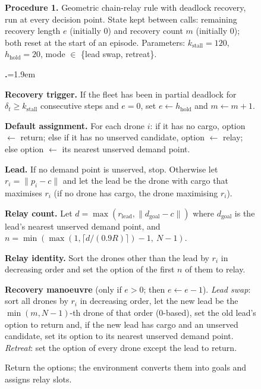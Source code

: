 \documentclass[final,5p,times,twocolumn]{elsarticle}
\newcounter{procstep}
\newenvironment{procsteps}{\setcounter{procstep}{0}\begin{list}{\stepcounter{procstep}\textbf{\theprocstep.}}{\leftmargin=1.9em\itemsep=1.5pt\parsep=0pt\topsep=3pt}}{\end{list}}
\begin{document}
\begin{figure}[t]
\footnotesize
\noindent\textbf{Procedure 1.} Geometric chain-relay rule with deadlock recovery, run at every
decision point. State kept between calls: remaining recovery length $e$ (initially 0) and recovery
count $m$ (initially 0); both reset at the start of an episode. Parameters:
$k_{\mathrm{stall}} = 120$, $h_{\mathrm{hold}} = 20$, mode $\in$ \{lead swap, retreat\}.
\begin{procsteps}
\item \textbf{Recovery trigger.} If the fleet has been in partial deadlock for
$\delta_t \ge k_{\mathrm{stall}}$ consecutive steps and $e = 0$, set $e \leftarrow
h_{\mathrm{hold}}$ and $m \leftarrow m + 1$.
\item \textbf{Default assignment.} For each drone $i$: if it has no cargo, option $\leftarrow$
return; else if it has no unserved candidate, option $\leftarrow$ relay; else option
$\leftarrow$ its nearest unserved demand point.
\item \textbf{Lead.} If no demand point is unserved, stop. Otherwise let $r_i = \|p_i - c\|$
and let the lead be the drone with cargo that maximises $r_i$ (if no drone has cargo, the drone
maximising $r_i$).
\item \textbf{Relay count.} Let $d = \max(r_{\mathrm{lead}}, \|d_{\mathrm{goal}} - c\|)$ where
$d_{\mathrm{goal}}$ is the lead's nearest unserved demand point, and
$n = \min(\max(1, \lceil d / (0.9R) \rceil) - 1,\ N - 1)$.
\item \textbf{Relay identity.} Sort the drones other than the lead by $r_i$ in decreasing order
and set the option of the first $n$ of them to relay.
\item \textbf{Recovery manoeuvre} (only if $e > 0$; then $e \leftarrow e - 1$). \emph{Lead swap}:
sort all drones by $r_i$ in decreasing order, let the new lead be the $\min(m, N-1)$-th drone of
that order (0-based), set the old lead's option to return and, if the new lead has cargo and an
unserved candidate, set its option to its nearest unserved demand point. \emph{Retreat}: set the
option of every drone except the lead to return.
\item Return the options; the environment converts them into goals and assigns relay slots.
\end{procsteps}
\label{proc:heur}
\end{figure}
\end{document}
